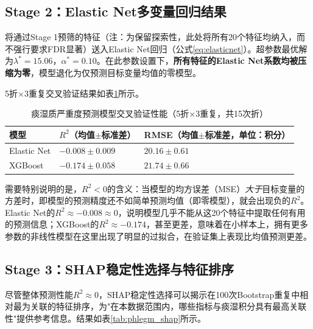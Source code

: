 \documentclass[12pt,a4paper]{ctexart}
\begin{document}
\subsection{Stage 2：Elastic Net多变量回归结果}

将通过Stage 1预筛的特征（注：为保留探索性，此处将所有20个特征均纳入，而不强行要求FDR显著）送入Elastic Net回归（公式\ref{eq:elasticnet}）。超参数最优解为$\lambda^* = 15.06$，$\alpha^* = 0.10$。在此参数设置下，\textbf{所有特征的Elastic Net系数均被压缩为零}，模型退化为仅预测目标变量均值的零模型。

5折$\times$3重复交叉验证结果如表\ref{tab:phlegm_cv}所示。

\begin{table}[H]
\centering
\caption{痰湿质严重度预测模型交叉验证性能（5折×3重复，共15次折）}
\label{tab:phlegm_cv}
\begin{tabular}{lll}
\toprule
模型 & $R^2$（均值$\pm$标准差） & RMSE（均值$\pm$标准差，单位：积分） \\
\midrule
Elastic Net & $-0.008 \pm 0.009$ & $20.16 \pm 0.61$ \\
XGBoost     & $-0.174 \pm 0.058$ & $21.74 \pm 0.66$ \\
\bottomrule
\end{tabular}
\end{table}

需要特别说明的是，$R^2 < 0$的含义：当模型的均方误差（MSE）\textit{大于}目标变量的方差时，即模型的预测精度还不如简单预测均值（即零模型），就会出现负的$R^2$。Elastic Net的$R^2 \approx -0.008 \approx 0$，说明模型几乎不能从这20个特征中提取任何有用的预测信息；XGBoost的$R^2 \approx -0.174$，甚至更差，意味着在小样本上，拥有更多参数的非线性模型在这里出现了明显的过拟合，在验证集上表现比均值预测更差。

\subsection{Stage 3：SHAP稳定性选择与特征排序}

尽管整体预测性能$R^2 \approx 0$，SHAP稳定性选择可以揭示在100次Bootstrap重复中相对最为关联的特征排序，为"在本数据范围内，哪些指标与痰湿积分具有最高关联性"提供参考信息。结果如表\ref{tab:phlegm_shap}所示。
\end{document}
